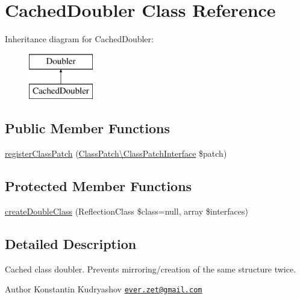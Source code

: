 \hypertarget{class_prophecy_1_1_doubler_1_1_cached_doubler}{}\section{Cached\+Doubler Class Reference}
\label{class_prophecy_1_1_doubler_1_1_cached_doubler}
Inheritance diagram for Cached\+Doubler\+:\begin{figure}[H]
\begin{center}
\leavevmode
\includegraphics[height=2.000000cm]{class_prophecy_1_1_doubler_1_1_cached_doubler}
\end{center}
\end{figure}
\subsection*{Public Member Functions}
\begin{DoxyCompactItemize}
\item 
\mbox{\hyperlink{class_prophecy_1_1_doubler_1_1_cached_doubler_a545eaf98626bca9e5906ab7c5b629e33}{register\+Class\+Patch}} (\mbox{\hyperlink{interface_prophecy_1_1_doubler_1_1_class_patch_1_1_class_patch_interface}{Class\+Patch\textbackslash{}\+Class\+Patch\+Interface}} \$patch)
\end{DoxyCompactItemize}
\subsection*{Protected Member Functions}
\begin{DoxyCompactItemize}
\item 
\mbox{\hyperlink{class_prophecy_1_1_doubler_1_1_cached_doubler_a33ece4af76302e33e81acfc979b8ad1d}{create\+Double\+Class}} (Reflection\+Class \$class=null, array \$interfaces)
\end{DoxyCompactItemize}


\subsection{Detailed Description}
Cached class doubler. Prevents mirroring/creation of the same structure twice.

\begin{DoxyAuthor}{Author}
Konstantin Kudryashov \href{mailto:ever.zet@gmail.com}{\tt ever.\+zet@gmail.\+com} 
\end{DoxyAuthor}


